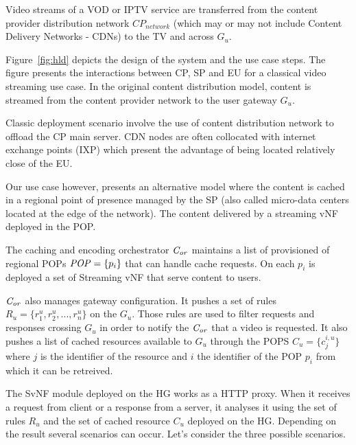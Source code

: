 Video streams of a VOD or IPTV service are transferred from the content provider distribution network \(\mathit{CP}_{\mathit{network}}\) (which may or may not include Content Delivery Networks - CDNs) to the TV and across $G_{u}$.

Figure~\ref{fig:hld} depicts the design of the system and the use case steps. The figure presents the interactions between CP, SP and EU for a classical video streaming use case.
In the original content distribution model, content is streamed from the content provider network  to the user gateway \(G_{u}\).

Classic deployment scenario involve the use of content distribution network to offload the CP main server.
CDN nodes are often collocated with internet exchange points (IXP) which present the advantage of being located relatively close of the EU.

Our use case however, presents an alternative model where the content is cached in a regional point of presence managed by the SP (also called micro-data centers located at the edge of the network). The content delivered by a streaming vNF deployed in the POP.

The caching and encoding orchestrator  $\mathit{C_{or}}$ maintains a list of provisioned of regional POPs \(\mathit{POP}=\{p_{i}\}\) that can handle cache requests. On each $p_{i}$ is deployed a set of Streaming vNF that serve content to users.

$\mathit{C_{or}}$ also manages gateway configuration. It pushes a set of rules \(R_{u}=\{r^{u}_{1},r^{u}_{2},...,r^{u}_{n}\}\) on the $G_{u}$. 
Those rules are used to filter requests and responses crossing $G_{u}$ in order to notify the $\mathit{C_{or}}$ that a video is requested.
It also pushes a list of cached resources available to $G_{u}$ through the POPS $C_{u}=\{c^{i,u}_{j} \}$ where $j$ is the identifier of the resource and $i$ the identifier of the POP $p_{i}$ from which it can be retreived.

The SvNF module deployed on the HG works as a HTTP proxy.
When it receives a request from client or a response from a server, it analyses it using the set of rules \(R_{u}\) and the set of cached resource $C_{u}$ deployed on the HG.
Depending on the result several scenarios can occur.
Let's consider the three possible scenarios.


